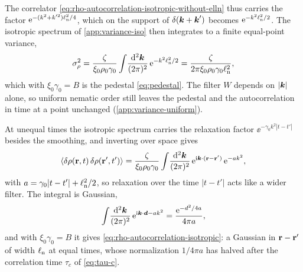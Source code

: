 \documentclass[aps,pre,reprint,superscriptaddress,longbibliography,nofootinbib
]{revtex4-2}
\begin{document}
The correlator
\cref{eq:rho-autocorrelation-isotropic-without-elln} thus
carries the factor $\mathrm{e}^{-(k^2+k'^2)\ell_{\rm n}^2/4}$, which on
the support of $\delta(\boldsymbol{k}+\boldsymbol{k}')$ becomes
$\mathrm{e}^{-k^2\ell_{\rm n}^2/2}$. The isotropic spectrum of
\cref{app:variance-iso} then integrates to a finite
equal-point variance,
\begin{equation}
  \sigma_\rho^2=\frac{\zeta}{\xi_0\rho_0\gamma_0}\int\!\frac{\mathrm{d}^2\boldsymbol{k}}{(2\pi)^2}\,
  \mathrm{e}^{-k^2\ell_{\rm n}^2/2}=\frac{\zeta}{2\pi\xi_0\rho_0\gamma_0\ell_{\rm n}^2},
\end{equation}
which with $\xi_0\gamma_0=B$ is the pedestal
\cref{eq:pedestal}. The filter $W$ depends on $|\boldsymbol{k}|$ alone,
so uniform nematic order still leaves the pedestal and the
autocorrelation in time at a point unchanged
(\cref{app:variance-uniform}).

At unequal times the isotropic spectrum carries the
relaxation factor $\ee^{-\gamma_0k^2|t-t'|}$ besides the
smoothing, and inverting over space gives
\begin{equation}
  \left\langle\delta\rho(\mathbf{r},t)\,\delta\rho(\mathbf{r}',t')\right\rangle=\frac{\zeta}{\xi_0\rho_0\gamma_0}
  \int\!\frac{\mathrm{d}^2\boldsymbol{k}}{(2\pi)^2}\,\mathrm{e}^{\mathrm{i}\boldsymbol{k}\cdot(\mathbf{r}-\mathbf{r}')}\,\mathrm{e}^{-a k^2},
\end{equation}
with $a=\gamma_0|t-t'|+\ell_{\rm n}^2/2$, so relaxation over the
time $|t-t'|$ acts like a wider filter. The integral is
Gaussian,
\begin{equation}
  \int\!\frac{\mathrm{d}^2\boldsymbol{k}}{(2\pi)^2}\,\mathrm{e}^{\mathrm{i}\boldsymbol{k}\cdot\boldsymbol d-ak^2}=\frac{\mathrm{e}^{-d^2/4a}}{4\pi a},
\end{equation}
and with $\xi_0\gamma_0=B$ it gives
\cref{eq:rho-autocorrelation-isotropic}: a Gaussian in
$\mathbf{r}-\mathbf{r}'$ of width $\ell_{\rm n}$ at equal times, whose
normalization $1/4\pi a$ has halved after the correlation
time $\tau_c$ of \cref{eq:tau-c}.
\end{document}
